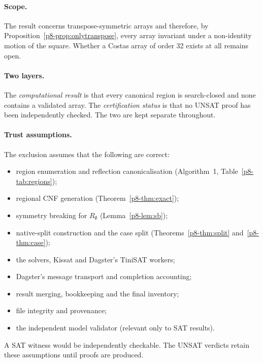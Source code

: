 \documentclass[11pt,a4paper,oneside]{report}
\theoremstyle{definition}
\newcommand{\st}[1]{\textsf{#1}}
\begin{document}
\paragraph{Scope.} The result concerns transpose-symmetric arrays and therefore, by
Proposition~\ref{p8-prop:onlytranspose}, every array invariant under a non-identity motion of the
square. Whether a Costas array of order 32
exists at all remains open.

\paragraph{Two layers.} The \emph{computational result} is that every canonical region is
\st{search-closed} and none contains a validated array. The \emph{certification status} is
that no UNSAT proof has been independently checked. The two are kept separate throughout.

\paragraph{Trust assumptions.} The exclusion assumes that the following are correct:
\begin{itemize}
\item region enumeration and reflection canonicalisation (Algorithm~1, Table~\ref{p8-tab:regions});
\item regional CNF generation (Theorem~\ref{p8-thm:exact});
\item symmetry breaking for $R_\emptyset$ (Lemma~\ref{p8-lem:sb});
\item native-split construction and the case split (Theorems~\ref{p8-thm:split} and~\ref{p8-thm:case});
\item the solvers, Kissat and Dagster's TiniSAT workers;
\item Dagster's message transport and completion accounting;
\item result merging, bookkeeping and the final inventory;
\item file integrity and provenance;
\item the independent model validator (relevant only to SAT results).
\end{itemize}
A SAT witness would be independently checkable. The UNSAT verdicts retain these assumptions
until proofs are produced.
\end{document}
